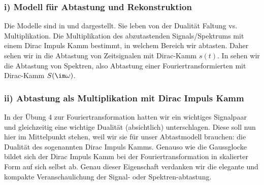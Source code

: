 \subsubsection*{i) Modell für Abtastung und Rekonstruktion}
Die Modelle sind in 
und  dargestellt. Sie leben
von der Dualität Faltung vs. Multiplikation.
Die Multiplikation des abzutastenden Signals/Spektrums mit einem Dirac Impuls Kamm
bestimmt, in welchem Bereich wir abtasten.
Daher sehen wir in  die Abtastung
von Zeitsignalen mit Dirac-Kamm $s(t)$. In 
sehen wir die Abtastung von Spektren, also Abtastung einer Fouriertransformierten
mit Dirac-Kamm $S(\im\omega)$.









\subsubsection*{ii) Abtastung als Multiplikation mit Dirac Impuls Kamm}
%
In der Übung 4 zur Fouriertransformation hatten wir ein wichtiges
Signalpaar und gleichzeitig eine wichtige Dualität (absichtlich) unterschlagen.
%
Diese soll nun hier im Mittelpunkt stehen, weil wir sie für unser Abtastmodell
brauchen: die Dualität des sogenannten Dirac Impuls Kamms.
%
Genauso wie die Gaussglocke bildet sich der Dirac Impuls Kamm bei der
Fouriertransformation in skalierter Form auf sich selbst ab.
%
Genau dieser Eigenschaft verdanken wir die elegante und kompakte Veranschaulichung
der Signal- oder Spektren-abtastung.

